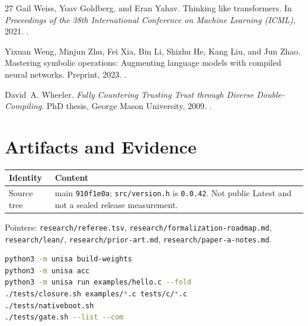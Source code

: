 \documentclass[11pt]{article}
\begin{document}
\begin{thebibliography}{27}
Gail Weiss, Yoav Goldberg, and Eran Yahav.
\newblock Thinking like transformers.
\newblock In \emph{Proceedings of the 38th International Conference on Machine Learning (ICML)}, 2021.
\newblock {}.

Yixuan Weng, Minjun Zhu, Fei Xia, Bin Li, Shizhu He, Kang Liu, and Jun Zhao.
\newblock Mastering symbolic operations: Augmenting language models with compiled neural networks.
\newblock Preprint, 2023.
\newblock {}.

David~A. Wheeler.
\newblock \emph{Fully Countering Trusting Trust through Diverse Double-Compiling}.
\newblock PhD thesis, George Mason University, 2009.
\newblock {}.

\end{thebibliography}

\appendix
\section{Artifacts and Evidence}\label{artifacts-and-evidence}

\begin{center}
\begin{tabular}{lp{}}
\toprule
Identity & Content \\
\midrule
Source tree & main \texttt{910f1e0a}; \texttt{src/version.h} is \texttt{0.0.42}. Not public Latest and not a sealed release measurement. \\
\bottomrule
\end{tabular}
\end{center}

Pointers: \texttt{research/referee.tsv}, \texttt{research/formalization-roadmap.md}, \texttt{research/lean/}, \texttt{research/prior-art.md}, \texttt{research/paper-a-notes.md}.

\begin{lstlisting}[language=bash,basicstyle=\ttfamily\scriptsize]
python3 -m unisa build-weights
python3 -m unisa acc
python3 -m unisa run examples/hello.c --fold
./tests/closure.sh examples/*.c tests/c/*.c
./tests/nativeboot.sh
./tests/gate.sh --list --com
\end{lstlisting}
\end{document}
